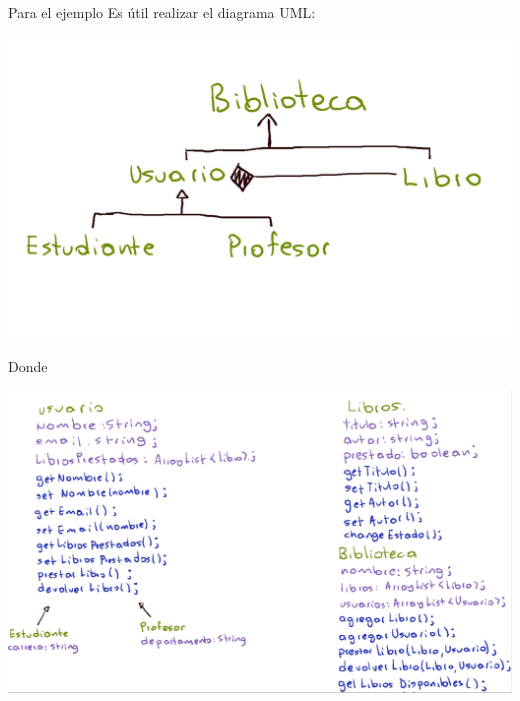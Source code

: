 \documentclass[executivepaper]{article}
\begin{document}
Para el ejemplo Es útil realizar el diagrama UML:\\
\begin{center}
    \includegraphics[scale=0.2]{3.1.png}\\ 
\end{center}
Donde\\
\begin{center}
    \includegraphics[scale=0.3]{3.2.png}\\ 
\end{center}
\end{document}

